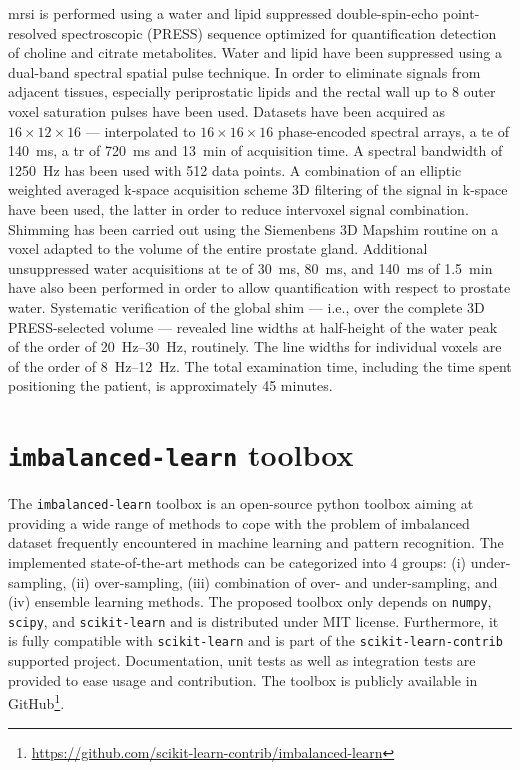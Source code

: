 \ac{mrsi} is performed using a water and lipid suppressed double-spin-echo point-resolved spectroscopic (PRESS) sequence optimized for quantification detection of choline and citrate metabolites.
Water and lipid have been suppressed using a dual-band spectral spatial pulse technique.
In order to eliminate signals from adjacent tissues, especially periprostatic lipids and the rectal wall up to 8 outer voxel saturation pulses have been used.
Datasets have been acquired as $16 \times 12 \times 16$ --- interpolated to $16 \times 16 \times 16$ phase-encoded spectral arrays, a \ac{te} of \SI{140}{\ms}, a \ac{tr} of \SI{720}{\ms} and \SI{13}{\minute} of acquisition time.
A spectral bandwidth of \SI{1250}{\hertz} has been used with 512 data points.
A combination of an elliptic weighted averaged k-space acquisition scheme 3D filtering of the signal in k-space have been used, the latter in order to reduce intervoxel signal combination.
Shimming has been carried out using the Siemenbens 3D Mapshim routine on a voxel adapted to the volume of the entire prostate gland.
Additional unsuppressed water acquisitions at \ac{te} of \SI{30}{\ms}, \SI{80}{\ms}, and \SI{140}{\ms} of \SI{1.5}{\minute} have also been performed in order to allow quantification with respect to prostate water.
Systematic verification of the global shim --- i.e., over the complete 3D PRESS-selected volume --- revealed line widths at half-height of the water peak of the order of \SIrange{20}{30}{\hertz}, routinely.
The line widths for individual voxels are of the order of \SIrange{8}{12}{\hertz}.
The total examination time, including the time spent positioning the patient, is approximately 45 minutes.


\section{\texttt{imbalanced-learn} toolbox}\label{chp4:sec:imblearn}

The \texttt{imbalanced-learn} toolbox is an open-source python toolbox aiming at providing a wide range of methods to cope with the problem of imbalanced dataset frequently encountered in machine learning and pattern recognition.
The implemented state-of-the-art methods can be categorized into 4 groups: (i) under-sampling, (ii) over-sampling, (iii) combination of over- and under-sampling, and (iv) ensemble learning methods.
The proposed toolbox only depends on \texttt{numpy}, \texttt{scipy}, and \texttt{scikit-learn} and is distributed under MIT license.
Furthermore, it is fully compatible with \texttt{scikit-learn} and is part of the \texttt{scikit-learn-contrib} supported project.
Documentation, unit tests as well as integration tests are provided to ease usage and contribution.
The toolbox is publicly available in GitHub\footnote{\url{https://github.com/scikit-learn-contrib/imbalanced-learn}}.

